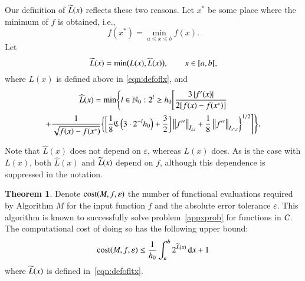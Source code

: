 \documentclass[review]{elsarticle}
\newcommand{\abstol}{\varepsilon}
\theoremstyle{definition}
\newcommand{\chL}{\widehat{L}}
\newtheorem{theorem}{Theorem}
\begin{document}
Our definition of $\widetilde{L}(x)$ reflects these two reasons.  Let $x^*$ be some place where the minimum of $f$ is obtained, i.e.,
\[
f(x^*)  = \min_{a \le x \le b} f(x).
\]
Let
\begin{equation}\label{eqn:defofltx}
\tL(x) = \min\bigl(L(x),\chL(x)\bigr), \qquad x \in [a,b[,
\end{equation}
where $L(x)$ is defined above in \eqref{eqn:defoflx}, and
\begin{multline}\label{eqn:defoflt1x}
\chL(x) = \min \Biggl\{ l \in \mathbb{N}_0 :  2^l \ge h_0 \Biggl[ \frac{3\abs{f'(x)}}{2[f(x) - f(x^*)]} \\
+  \frac{1}{\sqrt{f(x) - f(x^*)}} \biggl\{ \biggl[\frac 18 \fC\left(3\cdot2^{-l}h_0\right) + \frac 32 \biggr]   \norm[\bar{I}_{x,l}]{f''}
+ \frac18\norm[{I_{x^*,l}}]{f''} \biggr\}^{1/2} \Biggr] \Biggr\}.
\end{multline}

Note that $\chL(x)$ does not depend on $\abstol$, whereas $L(x)$ does.
As is the case with $L(x)$, both $\chL(x)$ and $\widetilde{L}(x)$  depend on $f$, although this dependence is suppressed in the notation.

\begin{theorem}\label{thm:Mcost}
	Denote $\cost(M,f,\abstol)$ the number of functional evaluations required by Algorithm $M$ for the input function $f$ and the absolute error tolerance $\abstol$.  This algorithm is known to successfully solve problem~\eqref{appxprob} for functions in $\mathcal{C}$.  The computational cost of doing so has the following upper bound:
	\begin{equation*}
	\cost(M,f,\abstol) \le \frac{1}{h_0}\int_a^b 2^{\tL(x)} \, \dif x +1 \\
	\end{equation*}
	where $\widetilde{L}(x)$ is defined in~\eqref{eqn:defofltx}.
\end{theorem}
\end{document}
